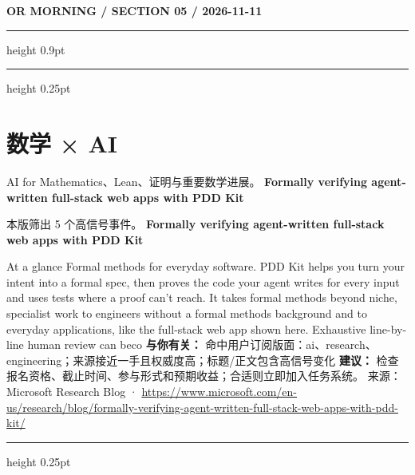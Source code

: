 \documentclass[10.5pt]{ctexart}
\begin{document}
\newpage
{\small\bfseries OR MORNING / SECTION 05 / 2026-11-11}
\vspace{2mm}
\hrule height 0.9pt
\vspace{1.5mm}
\hrule height 0.25pt
\vspace{4mm}
\section*{数学 × AI}
{\color{ormuted} AI for Mathematics、Lean、证明与重要数学进展。}
\vspace{2mm}
{\LARGE\bfseries Formally verifying agent-written full-stack web apps with PDD Kit}\par
\vspace{1mm}
{\color{ormuted} 本版筛出 5 个高信号事件。}
\vspace{3mm}
{\Large\bfseries Formally verifying agent-written full-stack web apps with PDD Kit}\par
At a glance Formal methods for everyday software. PDD Kit helps you turn your intent into a formal spec, then proves the code your agent writes for every input and uses tests where a proof can’t reach. It takes formal methods beyond niche, specialist work to engineers without a formal methods background and to everyday applications, like the full-stack web app shown here. Exhaustive line-by-line human review can beco
\textbf{与你有关：} 命中用户订阅版面：ai、research、engineering；来源接近一手且权威度高；标题/正文包含高信号变化
\textbf{建议：} 检查报名资格、截止时间、参与形式和预期收益；合适则立即加入任务系统。
{\footnotesize\color{ormuted} 来源：Microsoft Research Blog · \url{https://www.microsoft.com/en-us/research/blog/formally-verifying-agent-written-full-stack-web-apps-with-pdd-kit/}}
\vspace{4mm}
\hrule height 0.25pt
\vspace{3mm}
\end{document}

